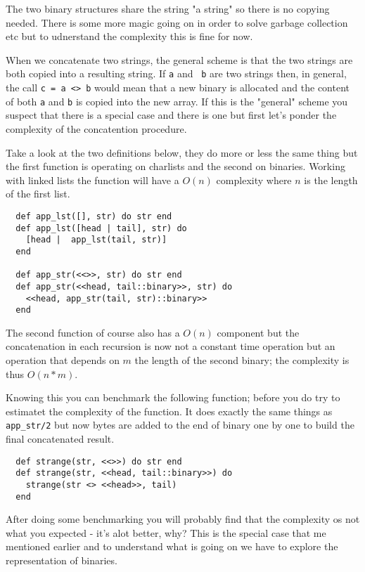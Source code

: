 \documentclass[a4paper,11pt]{article}
\begin{document}
The two binary structures share the string "a string" so there is no
copying needed. There is some more magic going on in order to solve
garbage collection etc but to udnerstand the complexity this is fine
for now.

When we concatenate two strings, the general scheme is that the two
strings are both copied into a resulting string. If {\tt a} and {\tt
  b} are two strings then, in general, the call {\tt c = a <> b} would
mean that a new binary is allocated and the content of both {\tt a}
and {\tt b} is copied into the new array. If this is the "general"
scheme you suspect that there is a special case and there is one but
first let's ponder the complexity of the concatention procedure.

Take a look at the two definitions below, they do more or less the
same thing but the first function is operating on charlists and the
second on binaries. Working with linked lists the function will have a
$O(n)$ complexity where $n$ is the length of the first list. 

\begin{verbatim}
  def app_lst([], str) do str end
  def app_lst([head | tail], str) do
    [head |  app_lst(tail, str)]
  end    
  
  def app_str(<<>>, str) do str end
  def app_str(<<head, tail::binary>>, str) do
    <<head, app_str(tail, str)::binary>>
  end  
\end{verbatim}

The second function of course also has a $O(n)$ component but the
concatenation in each recursion is now not a constant time operation
but an operation that depends on $m$ the length of the second binary;
the complexity is thus $O(n*m)$. 

Knowing this you can benchmark the following function; before you do
try to estimatet the complexity of the function. It does exactly the
same things as {\tt app_str/2} but now bytes are added to the end of
binary one by one to build the final concatenated result.

\begin{verbatim}
  def strange(str, <<>>) do str end
  def strange(str, <<head, tail::binary>>) do
    strange(str <> <<head>>, tail)
  end
\end{verbatim}

After doing some benchmarking you will probably find that the
complexity os not what you expected - it's alot better, why? This is
the special case that me mentioned earlier and to understand what is
going on we have to explore the representation of binaries.
\end{document}
